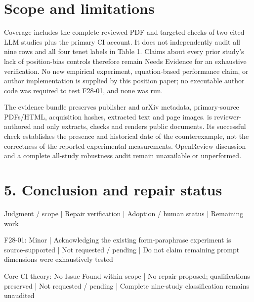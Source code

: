 \documentclass[10pt]{article}
\begin{document}
\section*{Scope and limitations}
Coverage includes the complete reviewed PDF and targeted checks of two cited LLM studies plus the primary CI account. It does not independently audit all nine rows and all four tenet labels in Table 1. Claims about every prior study’s lack of position-bias controls therefore remain Needs Evidence for an exhaustive verification. No new empirical experiment, equation-based performance claim, or author implementation is supplied by this position paper; no executable author code was required to test F28-01, and none was run.\par
The evidence bundle preserves publisher and arXiv metadata, primary-source PDFs/HTML, acquisition hashes, extracted text and page images. is reviewer-authored and only extracts, checks and renders public documents. Its successful check establishes the presence and historical date of the counterexample, not the correctness of the reported experimental measurements. OpenReview discussion and a complete all-study robustness audit remain unavailable or unperformed.\par
\section*{5. Conclusion and repair status}
Judgment / scope | Repair verification | Adoption / human status | Remaining work\par
F28-01: Minor | Acknowledging the existing form-paraphrase experiment is source-supported | Not requested / pending | Do not claim remaining prompt dimensions were exhaustively tested\par
Core CI theory: No Issue Found within scope | No repair proposed; qualifications preserved | Not requested / pending | Complete nine-study classification remains unaudited\par
\end{document}
